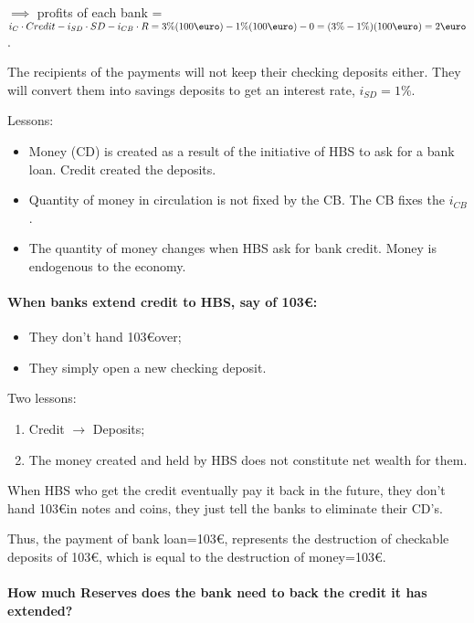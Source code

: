 \documentclass{report}
\begin{document}
$\implies$ profits of each bank = $ i_C \cdot Credit-i_{SD}\cdot SD-i_{CB}\cdot R=3\%(100\text{\euro})-1\%(100\text{\euro})-0=(3\%-1\%)(100\text{\euro})=2\text{\euro}$.

The recipients of the payments will not keep their checking deposits either. They will convert them into savings deposits to get an interest rate, $i_{SD}=1\%$. 

Lessons:
\begin{itemize}
    \item Money (CD) is created as a result of the initiative of HBS to ask for a bank loan. Credit created the deposits. 
    \item Quantity of money in circulation is not fixed by the CB. The CB fixes the $i_{CB}$.
    \item The quantity of money changes when HBS ask for bank credit. Money is endogenous to the economy.
\end{itemize}

\paragraph{When banks extend credit to HBS, say of 103\euro:}
\begin{itemize}
    \item They don't hand 103\euro over; 
    \item They simply open a new checking deposit. 
\end{itemize}


Two lessons: 
\begin{enumerate}
    \item Credit $\rightarrow$ Deposits; 
    \item The money created and held by HBS does not constitute net wealth for them. 
\end{enumerate}

When HBS who get the credit eventually pay it back in the future, they don't hand 103\euro in notes and coins, they just tell the banks to eliminate their CD's. 

Thus, the payment of bank loan=103\euro, represents the destruction of checkable deposits of 103\euro, which is equal to the destruction of money=103\euro.

\paragraph{How much Reserves does the bank need to back the credit it has extended?}
\end{document}
